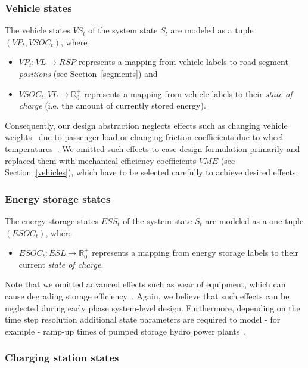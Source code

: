 \subsubsection{Vehicle states}
\label{states_vehicles}

The vehicle states $VS_t$ of the system state $S_t$ are modeled as a tuple $(VP_t, VSOC_t)$, where
\begin{itemize}
	\item $VP_t: VL \rightarrow RSP$ represents a mapping from vehicle labels to road segment \textit{positions} (see Section~\ref{segments}) and
	\item $VSOC_t: VL \rightarrow \mathbb{R}_0^+$ represents a mapping from vehicle labels to their \textit{state of charge} (i.e. the amount of currently stored energy).
\end{itemize}
Consequently, our design abstraction neglects effects such as changing vehicle weights~\cite{?} due to passenger load or changing friction coefficients due to wheel temperatures~\cite{?}. We omitted such effects to ease design formulation primarily and replaced them with mechanical efficiency coefficients $VME$ (see Section~\ref{vehicles}), which have to be selected carefully to achieve desired effects.

\subsubsection{Energy storage states}
\label{states_storages}

The energy storage states $ESS_t$ of the system state $S_t$ are modeled as a one-tuple $(ESOC_t)$, where
\begin{itemize}
	\item $ESOC_t: ESL \rightarrow \mathbb{R}_0^+$ represents a mapping from energy storage labels to their current \textit{state of charge}. 
\end{itemize}
Note that we omitted advanced effects such as wear of equipment, which can cause degrading storage efficiency~\cite{?}. Again, we believe that such effects can be neglected during early phase system-level design. Furthermore, depending on the time step resolution additional state parameters are required to model - for example - ramp-up times of pumped storage hydro power plants~\cite{Garcia2008}.

\subsubsection{Charging station states}
\label{states_stations}

